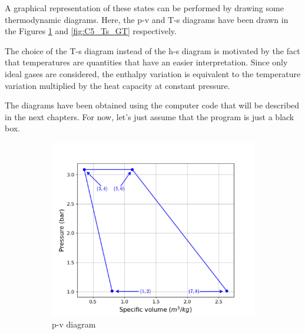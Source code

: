 A graphical representation of these states can be performed by drawing some thermodynamic diagrams. Here, the p-v and T-s diagrams have been drawn in the Figures \ref{fig:C5_pv_GT} and \ref{fig:C5_Ts_GT} respectively. 

The choice of the T-s diagram instead of the h-s diagram is motivated by the fact that temperatures are quantities that have an easier interpretation. Since only ideal gases are considered, the enthalpy variation is equivalent to the temperature variation multiplied by the heat capacity at constant pressure.

The diagrams have been obtained using the computer code that will be described in the next chapters. For now, let's just assume that the program is just a black box.


\begin{figure}[H]
     \centering
     \begin{subfigure}[b]{0.4\textwidth}
         \centering
         \includegraphics[width=\textwidth]{pv_GT}
         \caption{p-v diagram}
         \label{fig:C5_pv_GT}
     \end{subfigure}
     \begin{subfigure}[b]{0.4\textwidth}
         \centering

\end{subfigure}
\end{figure}
